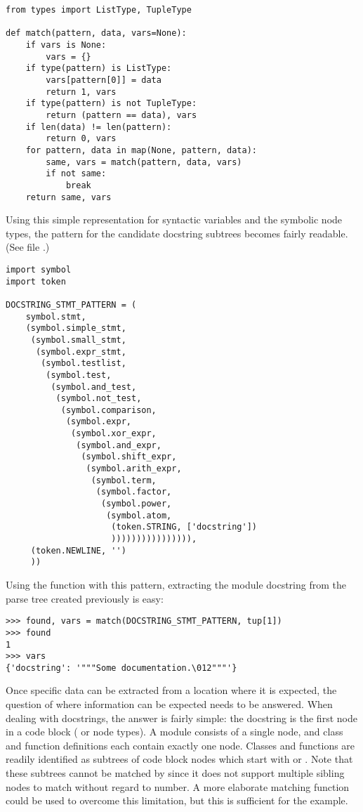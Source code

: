 \bcode\begin{verbatim}
from types import ListType, TupleType

def match(pattern, data, vars=None):
    if vars is None:
        vars = {}
    if type(pattern) is ListType:
        vars[pattern[0]] = data
        return 1, vars
    if type(pattern) is not TupleType:
        return (pattern == data), vars
    if len(data) != len(pattern):
        return 0, vars
    for pattern, data in map(None, pattern, data):
        same, vars = match(pattern, data, vars)
        if not same:
            break
    return same, vars
\end{verbatim}\ecode
%
Using this simple representation for syntactic variables and the symbolic
node types, the pattern for the candidate docstring subtrees becomes
fairly readable.  (See file .)

\bcode\begin{verbatim}
import symbol
import token

DOCSTRING_STMT_PATTERN = (
    symbol.stmt,
    (symbol.simple_stmt,
     (symbol.small_stmt,
      (symbol.expr_stmt,
       (symbol.testlist,
        (symbol.test,
         (symbol.and_test,
          (symbol.not_test,
           (symbol.comparison,
            (symbol.expr,
             (symbol.xor_expr,
              (symbol.and_expr,
               (symbol.shift_expr,
                (symbol.arith_expr,
                 (symbol.term,
                  (symbol.factor,
                   (symbol.power,
                    (symbol.atom,
                     (token.STRING, ['docstring'])
                     )))))))))))))))),
     (token.NEWLINE, '')
     ))
\end{verbatim}\ecode
%
Using the  function with this pattern, extracting the
module docstring from the parse tree created previously is easy:

\bcode\begin{verbatim}
>>> found, vars = match(DOCSTRING_STMT_PATTERN, tup[1])
>>> found
1
>>> vars
{'docstring': '"""Some documentation.\012"""'}
\end{verbatim}\ecode
%
Once specific data can be extracted from a location where it is
expected, the question of where information can be expected
needs to be answered.  When dealing with docstrings, the answer is
fairly simple: the docstring is the first  node in a code
block ( or  node types).  A module
consists of a single  node, and class and function
definitions each contain exactly one  node.  Classes and
functions are readily identified as subtrees of code block nodes which
start with  or
.  Note that these subtrees
cannot be matched by  since it does not support multiple
sibling nodes to match without regard to number.  A more elaborate
matching function could be used to overcome this limitation, but this
is sufficient for the example.

